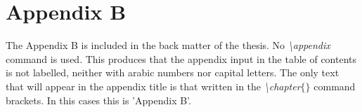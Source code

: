 \chapter{Appendix B}

The Appendix B is included in the back matter of the thesis. No \textit{\textbackslash\hspace{-0.5mm}appendix} command is used. This produces that the appendix input in the table of contents is not labelled, neither with arabic numbers nor capital letters. The only text that will appear in the appendix title is that written in the \textit{\textbackslash\hspace{-0.5mm}chapter}$\{\}$ command brackets. In this cases this is 'Appendix B'.